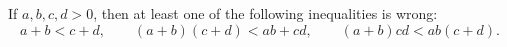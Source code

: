 If $a, b, c, d > 0$, then at least one of the following inequalities is wrong:
\[ a + b < c + d,\qquad (a + b)(c + d) < ab + cd,\qquad (a + b)cd < ab(c + d). \]
